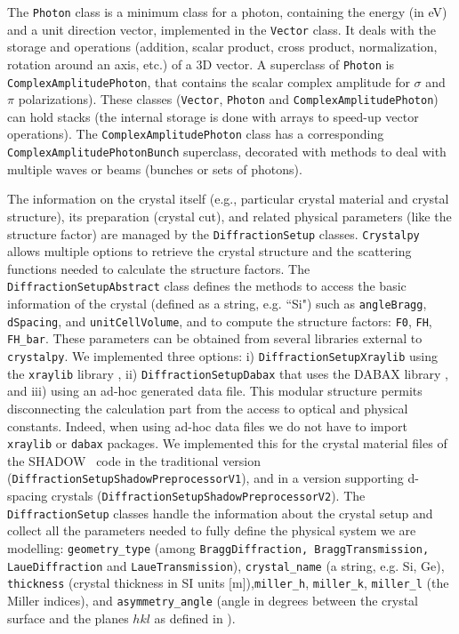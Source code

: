 \documentclass{iucr}
\begin{document}
The {\tt Photon} class is a minimum class for a photon, containing the energy (in eV) and a unit direction vector, implemented in 
the {\tt Vector} class. It deals with the storage and operations (addition, scalar product, cross product, normalization, rotation around an axis, etc.) of a 3D vector. A superclass of {\tt Photon} is {\tt ComplexAmplitudePhoton}, that contains the scalar complex amplitude for $\sigma$ and $\pi$ polarizations). 
These classes ({\tt Vector}, {\tt Photon} and {\tt ComplexAmplitudePhoton}) can hold stacks (the internal storage is done with arrays to speed-up vector operations). The {\tt ComplexAmplitudePhoton} class 
has a corresponding {\tt ComplexAmplitudePhotonBunch} superclass, decorated with methods to deal with multiple waves or beams (bunches or sets of photons). 

The information on the crystal itself (e.g., particular crystal material and crystal structure), its preparation (crystal cut), and related physical parameters (like the structure factor) are managed by the {\tt DiffractionSetup} classes.
{\tt Crystalpy} allows multiple options to retrieve the crystal structure and the scattering functions needed to calculate the structure factors. 
The {\tt DiffractionSetupAbstract} class defines the methods to access the basic information of the crystal (defined as a string, e.g. ``Si") such as {\tt angleBragg}, {\tt dSpacing}, and {\tt unitCellVolume}, and to compute the structure factors: {\tt F0}, {\tt FH}, {\tt FH\_bar}. These parameters can be obtained from several libraries external to {\tt crystalpy}. We implemented three options: i) {\tt DiffractionSetupXraylib} using the {\tt xraylib} library \cite{xraylib}, ii) {\tt DiffractionSetupDabax} that uses the DABAX library \cite{dabax}, and iii) using an ad-hoc generated data file. This modular structure permits disconnecting the calculation part from the access to optical and physical constants. Indeed, when using ad-hoc data files we do not have to import {\tt xraylib} or {\tt dabax} packages. We implemented this for the crystal material files of the SHADOW~\cite{codeSHADOW} code in the traditional version ({\tt DiffractionSetupShadowPreprocessorV1}), and in
a version supporting 
d-spacing crystals ({\tt DiffractionSetupShadowPreprocessorV2}).
The {\tt DiffractionSetup} classes handle the information about the crystal setup and collect all the parameters needed to fully define the physical system we are modelling:
{\tt geometry\_type} (among {\tt BraggDiffraction, BraggTransmission, LaueDiffraction} and {\tt LaueTransmission}), {\tt crystal\_name} (a string, e.g. Si, Ge), {\tt thickness} (crystal thickness in SI units [m]),{\tt miller\_h}, {\tt miller\_k}, {\tt miller\_l} (the Miller indices), and {\tt asymmetry\_angle} (angle in degrees between the crystal surface and the planes $hkl$ as defined in \cite{codeCRYSTAL}).
\end{document}
